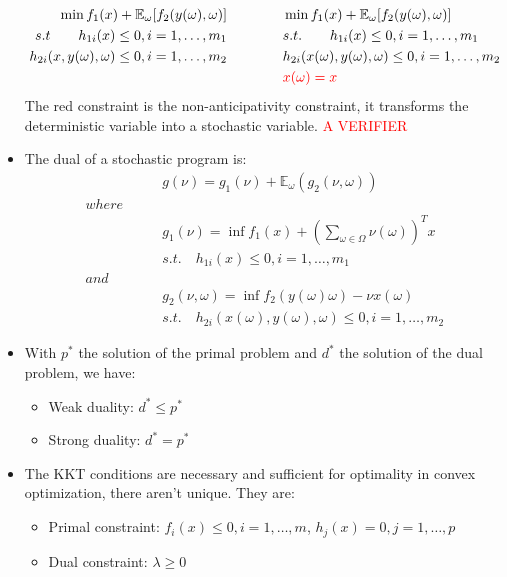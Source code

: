 \documentclass[12pt, openany]{report}
\newcommand{\E}{\mathbb{E}}
\theoremstyle{definition}
\begin{document}
\begin{itemize}
\begin{equation}
\begin{aligned}
			\min f_1(x) + \E_\omega[f_2(y(\omega), \omega)] \qquad & \qquad \min f_1(x) + \E_\omega[f_2(y(\omega), \omega)]\\
			s.t \qquad h_{1i}(x) \leq 0, i = 1, \dots, m_1 \qquad & \qquad s.t. \qquad h_{1i}(x) \leq 0, i = 1, \dots, m_1\\
			h_{2i}(x,y(\omega),\omega) \leq 0, i = 1, \dots, m_2 \qquad & \qquad h_{2i}(x(\omega),y(\omega),\omega) \leq 0, i = 1, \dots, m_2\\
			& \textcolor{red}{\qquad x(\omega) = x} 
		\end{aligned}
	\end{equation}
	The red constraint is the non-anticipativity constraint, it transforms the deterministic variable into a stochastic variable. \textcolor{red}{A VERIFIER}
	\item The dual of a stochastic program is:
	\begin{equation}
		\begin{aligned}
			& g(\nu) = g_1(\nu) + \E_\omega(g_2(\nu, \omega))\\
			where \qquad &  \\
			& g_1(\nu) = \inf f_1(x) + \left( \displaystyle \sum_{\omega \in \Omega} \nu(\omega) \right)^T x\\
			& s.t. \quad h_{1i} (x) \leq 0, i = 1, \dots, m_1\\
			and \qquad &  \\
			& g_2(\nu, \omega) = \inf f_2(y(\omega) \omega) - \nu x(\omega)\\
			& s.t. \quad h_{2i}(x(\omega), y(\omega), \omega) \leq 0, i = 1, \dots, m_2
		\end{aligned}
	\end{equation}
	\item  With $p^*$ the solution of the primal problem and $d^*$ the solution of the dual problem, we have:
	\begin{itemize}
		\item Weak duality: $d^* \leq p^*$
		\item Strong duality: $d^* = p^*$
	\end{itemize}
	\item The KKT conditions are necessary and sufficient for optimality in convex optimization, there aren't unique. They are:
	\begin{itemize}
		\item Primal constraint: $f_i(x) \leq 0, i = 1, \dots, m$, $h_j(x) = 0, j = 1, \dots, p$
		\item Dual constraint: $\lambda \geq 0$

\end{itemize}
\end{itemize}
\end{document}
